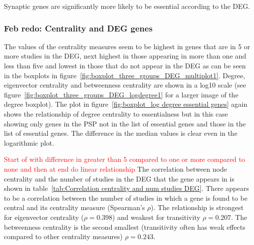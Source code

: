 Synaptic genes are significantly more likely to be essential according to the DEG.

\subsubsection{Feb redo: Centrality and DEG genes}


   

The values of the centrality measures seem to be highest in genes that are in 5 or more studies in the DEG, next highest in those appearing in more than one and less than five and lowest in those that do not appear in the DEG as can be seen in the boxplots in figure~\ref{fig:boxplot_three_groups_DEG_multiplot1}. Degree, eigenvector centrality and betweenness centrality are shown in a log10 scale (see figure~\ref{fig:boxplot_three_groups_DEG_logdegree1} for a larger image of the degree boxplot). The plot in figure~\ref{fig:boxplot_log degree essential genes} again shows the relationship of degree centrality to essentialness but in this case showing only genes in the PSP not in the list of essential genes and those in the list of essential genes. The difference in the median values is clear even in the logarithmic plot. 

\textcolor{red}{Start of with difference in greater than 5 compared to one or more compared to none and then at end do linear relationship}
The correlation between node centrality and the number of studies in the DEG that the gene appears in is shown in table~\ref{tab:Correlation centrality and num studies DEG}. There appears to be a correlation between the number of studies in which a gene is found to be central and its centrality measure (Spearman's $\rho$). The relationship is strongest for eigenvector centrality ($\rho=0.398$) and weakest for transitivity $\rho=0.207$. The betweenness centrality is the second smallest (transitivity often has weak effects compared to other centrality measures) $\rho=0.243$.





